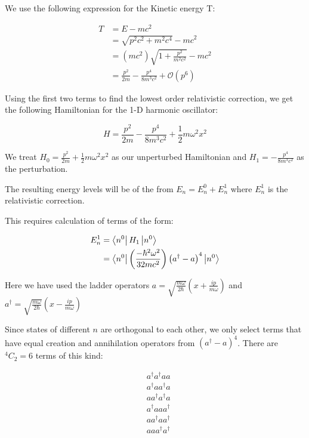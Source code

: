 \question
We use the following expression for the Kinetic energy T:

\begin{equation}
    \begin{split}
        T &= E - mc^2\\
        &= \sqrt{p^2c^2 + m^2c^4} - mc^2\\
        &= \left( mc^2 \right) \sqrt{1+ \frac{p^2}{m^2c^2}} - mc^2\\
        &= \frac{p^2}{2m} - \frac{p^4}{8m^3c^2} + \mathcal{O}(p^6) 
    \end{split}
\end{equation}

Using the first two terms to find the lowest order relativistic correction, we get the following Hamiltonian for the 1-D harmonic oscillator:

\begin{equation}
H = \frac{p^2}{2m} - \frac{p^4}{8m^3c^2} + \frac{1}{2}m \omega^2 x^2
\end{equation}

We treat $H_0 = \frac{p^2}{2m}+ \frac{1}{2}m \omega^2 x^2$ as our unperturbed Hamiltonian and $H_1 =  - \frac{p^4}{8m^3c^2}$ as the perturbation. 

The resulting energy levels will be of the from $E_n = E^0_n + E^1_n$ where $E^1_n$ is the relativistic correction.

This requires calculation of terms of the form:

\begin{equation}
\begin{split}
    E^1_n &= \bra{n^0} H_1 \ket{n^0}\\
    &= \bra{n^0} \left( \frac{-\hbar^2 \omega^2}{32 m c^2} \right) \left( a^\dagger - a\right)^4  \ket{n^0}\\
\end{split}
\end{equation}

Here we have used the ladder operators $a = \sqrt{\frac{m \omega}{2 \hbar}} \left( x + \frac{ip}{m \omega} \right)$ and $a^\dagger = \sqrt{\frac{m \omega}{2 \hbar}} \left( x - \frac{ip}{m \omega} \right)$

Since states of different $n$ are orthogonal to each other, we only select terms that have equal creation and annihilation operators from $(a^\dagger - a)^4$. There are $^4 C_2 = 6$ terms of this kind:

\begin{equation}
    \begin{split}
        & a^\dagger a^\dagger a a\\
        &a^\dagger a a^\dagger a\\
        &a a^\dagger a^\dagger a\\
        &a^\dagger a a a^\dagger \\
        & a a^\dagger a a^\dagger \\
        & a a a^\dagger a^\dagger \\
    \end{split}
\end{equation}

